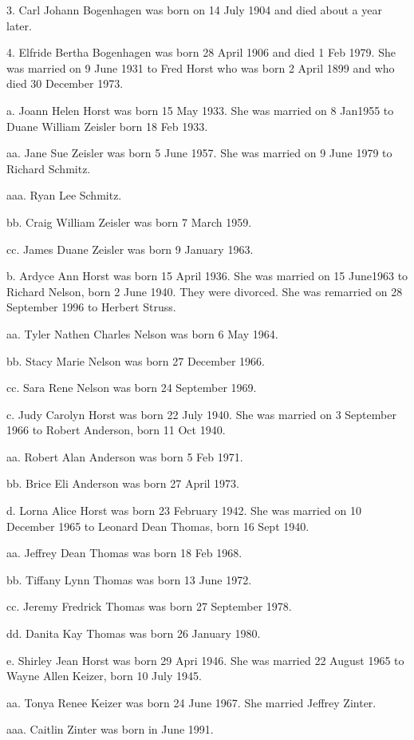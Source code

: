 \documentclass[a4paper]{article}
\begin{document}
3. Carl Johann Bogenhagen was born on 14 July 1904 and died about a year later.

4. Elfride Bertha Bogenhagen was born 28 April 1906 and died 1 Feb 1979.  She was married on 9 June 1931 to Fred Horst who was born 2 April 1899 and who died 30 December 1973.

a. Joann Helen Horst was born 15 May 1933.  She was married on 8 Jan1955 to Duane William Zeisler born 18 Feb 1933.

aa. Jane Sue Zeisler was born 5 June 1957.  She was married on 9 June 1979 to Richard Schmitz.

aaa. Ryan Lee Schmitz.

bb. Craig William Zeisler was born 7 March 1959.

cc. James Duane Zeisler was born 9 January 1963.

b. Ardyce Ann Horst was born 15 April 1936.  She was married on 15 June1963 to Richard Nelson, born 2 June 1940.  They were divorced.  She was remarried on 28 September 1996 to Herbert Struss.

aa. Tyler Nathen Charles Nelson  was born 6 May 1964.

bb. Stacy Marie Nelson was born 27 December 1966.

cc. Sara Rene Nelson was born 24 September 1969.

c. Judy Carolyn Horst was born 22 July 1940.  She was married on 3 September 1966 to Robert Anderson, born 11 Oct 1940.

aa. Robert Alan Anderson was born 5 Feb 1971.

bb. Brice Eli Anderson was born 27 April 1973.

d. Lorna Alice Horst was born 23 February 1942.  She was married on 10 December 1965 to Leonard Dean Thomas, born 16 Sept 1940.

aa. Jeffrey Dean Thomas was born 18 Feb 1968.

bb. Tiffany Lynn Thomas was born 13 June 1972.

cc. Jeremy Fredrick Thomas was born 27 September 1978.

dd. Danita Kay Thomas was born 26 January 1980.

e. Shirley Jean Horst was born 29 Apri 1946.  She was married 22 August 1965 to Wayne Allen Keizer, born 10 July 1945.

aa. Tonya Renee Keizer was born 24 June 1967. She married Jeffrey Zinter.
				 
aaa. Caitlin Zinter was born in June 1991. 
\end{document}
